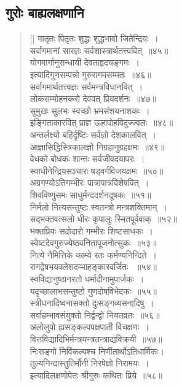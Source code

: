 \documentclass[twoside,12pt,notitlepage]{book}
\begin{document}
\subsection*{गुरोः बाह्यलक्षणानि}
\begin{verse}[\versewidth]
मातृतः पितृतः शुद्धः शुद्धभावो जितेन्द्रियः~।\\[-6pt]
सर्वागमानां सारज्ञः सर्वशास्त्रार्थतत्त्ववित्~॥४५॥\\
योगमार्गानुसन्धायी देवताहृदयङ्गमः~।\\[-6pt]
इत्यादिगुणसम्पन्नो गुरुरागमसम्मतः~॥४६॥\\
सर्वागमार्थतत्त्वज्ञः सर्वमन्त्रविधानवित्~।\\[-6pt]
लोकसम्मोहनकरो देववत् प्रियदर्शनः~॥४७॥\footA \\
सुमुखः सुलभः स्वच्छो भ्रमसंशयनाशकः~।\\[-6pt]
इङ्गिताकारवित् प्राज्ञ ऊहापोहविदुज्ज्वलः~॥४८॥\\
अन्तर्लक्ष्यो बहिर्दृष्टिः सर्वज्ञो देशकालवित्~।\\[-6pt]
आज्ञासिद्धिस्त्रिकालज्ञो निग्रहानुग्रहक्षमः~॥४९॥\footA \\ 
वेधको बोधकः शान्तः सर्वजीवदयापरः~।\\[-6pt]
स्वाधीनेन्द्रियसञ्चारः षड्वर्गविजयक्षमः~॥५०॥\footA \\
अग्रगण्योऽतिगम्भीरः पात्रापात्रविशेषवित्~।\\[-6pt]
शिवविष्णुसमः साधुर्मन्ददर्शनदूषकः~॥५१॥\footA \\
निर्मलो नित्यसन्तुष्टः स्वतन्त्रो मन्त्रशक्तिमान्~।\\[-6pt]
सद्भक्तवत्सलो धीरः कृपालुः स्मितपूर्ववाक्~॥५२॥\\
भक्तप्रियः सदोदारो गम्भीरः शिष्टसाधकः~।\\[-6pt]
स्वेष्टदेवगुरुज्येष्ठवनितापूजनोत्सुकः~॥५३॥\footA \\
नित्ये नैमित्तिके काम्ये रतः कर्मण्यनिन्दिते~।\\[-6pt]
रागद्वेषभयक्लेशदम्भाहङ्कारवर्जितः ~॥५४॥\footA \\
  स्वविद्यानुष्ठानरतो धर्मादीनामुपार्जकः~।\\[-6pt]
  यदृच्छालाभसन्तुष्टो गुणदोषविभेदकः~॥५५॥\footA  \\
  स्त्रीधनादिष्वनासक्तो दुःसङ्गव्यसनादि़षु~।\\[-6pt]
  सर्वाहम्भावसंयुक्तो निर्द्वन्द्वो नियतव्रतः~॥५६॥\footA \\
  अलोलुपो ह्यसङ्कल्पपक्षपाती विचक्षणः~।\\[-6pt]
  वित्तविद्यादिभिर्मन्त्रयन्त्रतन्त्राद्यविक्रयी~॥५७॥\footA \\
  निःसङ्गो निर्विकल्पश्च निर्णीतार्थोऽतिधार्मिकः।\\[-6pt]
  तुल्यनिन्दास्तुतिर्मौनी निरपेक्षो निरामयः~।\\[-6pt]
  इत्यादिलक्षणोपेतः श्रीगुरुः कथितः प्रिये~॥५८॥\footA 
\end{verse}   
  
\end{document}
